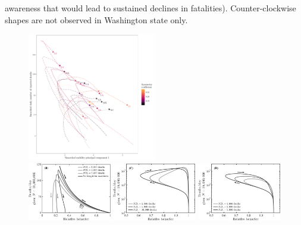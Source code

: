 awareness that would lead to sustained declines in fatalities).
Counter-clockwise shapes are not observed in Washington state only. 
\begin{figure}
\begin{center}
\mbox{\hspace{0.05\textwidth}}
\includegraphics[width=0.5\textwidth]{deaths/national_deaths_metric_phase_pca_grand.pdf}\\
\includegraphics[width=0.325\textwidth]{scripts/figseir_phase2_noname.pdf}
\includegraphics[width=0.325\textwidth]{scripts/figseir_phase2_statefix_noname.pdf}
\includegraphics[width=0.325\textwidth]{scripts/figseir_phase2_state_noname.pdf}

\end{center}
\end{figure}
